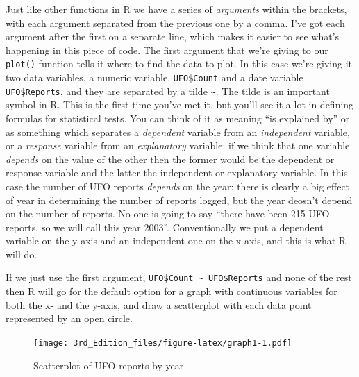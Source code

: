 \documentclass[
]{book}
\newenvironment{Shaded}{\begin{snugshade}}{\end{snugshade}}
\newcommand{\KeywordTok}[1]{\textcolor[rgb]{0.13,0.29,0.53}{\textbf{#1}}}
\newcommand{\NormalTok}[1]{#1}
\newcommand{\OperatorTok}[1]{\textcolor[rgb]{0.81,0.36,0.00}{\textbf{#1}}}
\newcommand{\StringTok}[1]{\textcolor[rgb]{0.31,0.60,0.02}{#1}}
\begin{document}
Just like other functions in R we have a series of \emph{arguments} within the brackets, with each argument separated from the previous one by a comma. I've got each argument after the first on a separate line, which makes it easier to see what's happening in this piece of code. The first argument that we're giving to our \texttt{plot()} function tells it where to find the data to plot. In this case we're giving it two data variables, a numeric variable, \texttt{UFO\$Count} and a date variable \texttt{UFO\$Reports}, and they are separated by a tilde \texttt{\textasciitilde{}}. The tilde is an important symbol in R. This is the first time you've met it, but you'll see it a lot in defining formulas for statistical tests. You can think of it as meaning ``is explained by'' or as something which separates a \emph{dependent} variable from an \emph{independent} variable, or a \emph{response} variable from an \emph{explanatory} variable: if we think that one variable \emph{depends} on the value of the other then the former would be the dependent or response variable and the latter the independent or explanatory variable. In this case the number of UFO reports \emph{depends} on the year: there is clearly a big effect of year in determining the number of reports logged, but the year deosn't depend on the number of reports. No-one is going to say ``there have been 215 UFO reports, so we will call this year 2003''. Conventionally we put a dependent variable on the y-axis and an independent one on the x-axis, and this is what R will do.

If we just use the first argument, \texttt{UFO\$Count\ \textasciitilde{}\ UFO\$Reports} and none of the rest then R will go for the default option for a graph with continuous variables for both the x- and the y-axis, and draw a scatterplot with each data point represented by an open circle.

\begin{Shaded}
\end{Shaded}

\begin{figure}
\centering
\texttt{[image: 3rd\_Edition\_files/figure-latex/graph1-1.pdf]}
\caption{\label{fig:graph1}Scatterplot of UFO reports by year}
\end{figure}
\end{document}
